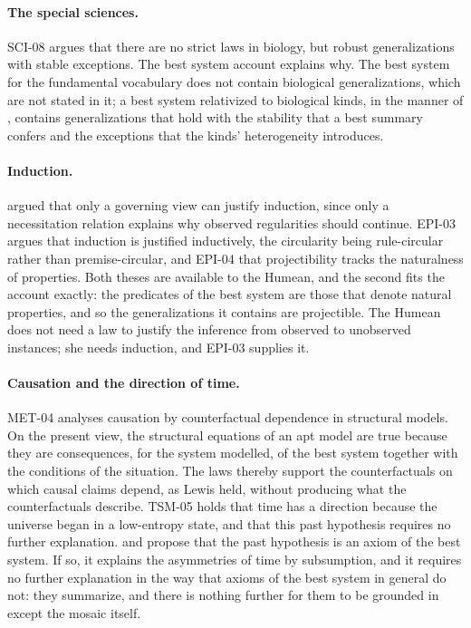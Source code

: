 \documentclass{situationist-preprint}
\begin{document}
\paragraph{The special sciences.} SCI-08 argues that there are no strict laws in biology, but robust generalizations with stable exceptions. The best system account explains why. The best system for the fundamental vocabulary does not contain biological generalizations, which are not stated in it; a best system relativized to biological kinds, in the manner of \citet{CohenCallender2009}, contains generalizations that hold with the stability that a best summary confers and the exceptions that the kinds' heterogeneity introduces.

\paragraph{Induction.} \citet{Armstrong1983} argued that only a governing view can justify induction, since only a necessitation relation explains why observed regularities should continue. EPI-03 argues that induction is justified inductively, the circularity being rule-circular rather than premise-circular, and EPI-04 that projectibility tracks the naturalness of properties. Both theses are available to the Humean, and the second fits the account exactly: the predicates of the best system are those that denote natural properties, and so the generalizations it contains are projectible. The Humean does not need a law to justify the inference from observed to unobserved instances; she needs induction, and EPI-03 supplies it.

\paragraph{Causation and the direction of time.} MET-04 analyses causation by counterfactual dependence in structural models. On the present view, the structural equations of an apt model are true because they are consequences, for the system modelled, of the best system together with the conditions of the situation. The laws thereby support the counterfactuals on which causal claims depend, as Lewis held, without producing what the counterfactuals describe. TSM-05 holds that time has a direction because the universe began in a low-entropy state, and that this past hypothesis requires no further explanation. \citet{Albert2000} and \citet{Loewer2012} propose that the past hypothesis is an axiom of the best system. If so, it explains the asymmetries of time by subsumption, and it requires no further explanation in the way that axioms of the best system in general do not: they summarize, and there is nothing further for them to be grounded in except the mosaic itself.
\end{document}
